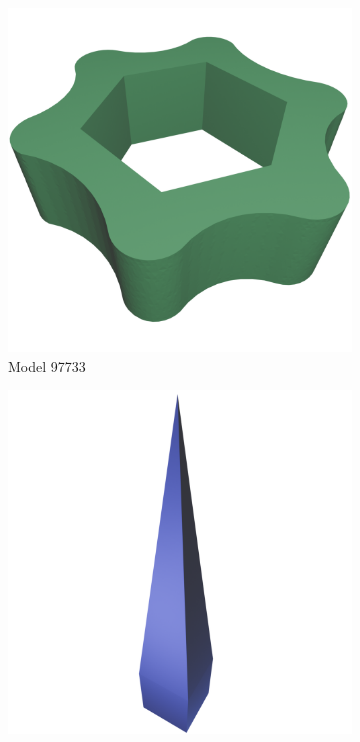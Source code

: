 \begin{figure}[htb]
\centering
\begin{subfigure}{0.3\textwidth}
	\includegraphics[width=\textwidth]{../resources/models/97733.png}
	\caption{Model 97733}
\end{subfigure}
\hfill
\begin{subfigure}{0.3\textwidth}
	\includegraphics[width=\textwidth]{../resources/models/42042.png}

\end{subfigure}
\end{figure}
